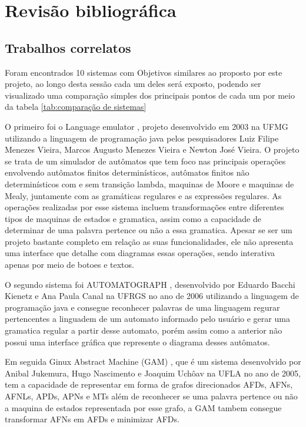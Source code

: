 \chapter{Revisão bibliográfica}
\label{cap:revisao}
\section{Trabalhos correlatos}
Foram encontrados 10 sistemas com Objetivos similares ao proposto por este projeto, ao longo desta sessão cada um deles será exposto, podendo ser visualizado uma comparação simples dos principais pontos de cada um por meio da tabela \ref{tab:comparação de sistemas}

O primeiro foi o Language emulator \cite{LanguageEmulator}, projeto desenvolvido em 2003 na UFMG  utilizando a linguagem de programação java pelos pesquisadores Luiz Filipe Menezes Vieira, Marcos Augusto Menezes Vieira e Newton José Vieira. O projeto se trata de um simulador de autômatos que tem foco nas principais operações envolvendo autômatos finitos determinísticos, autômatos finitos não determinísticos com e sem transição lambda, maquinas de Moore e maquinas de Mealy, juntamente com as gramáticas regulares e as expressões regulares. As operações realizadas por esse sistema incluem transformações entre diferentes tipos de maquinas de estados e gramatica, assim como a capacidade de determinar de uma palavra pertence ou não a essa gramatica. Apesar se ser um projeto bastante completo em relação as suas funcionalidades, ele não apresenta uma interface que detalhe com diagramas essas operações, sendo interativa apenas por meio de botoes e textos.

O segundo sistema foi AUTOMATOGRAPH  \cite{AUTOMATOGRAPH}, desenvolvido por Eduardo Bacchi Kienetz e Ana Paula Canal na UFRGS no ano de 2006 utilizando a linguagem de programação java e consegue reconhecer palavras de uma linguagem regurar pertencentes a linguadem de um automato informado pelo usuário e gerar uma gramatica regular a partir desse automato, porém assim como a anterior não possui uma interface gráfica que represente o diagrama desses autômatos.

Em seguida Ginux Abstract Machine (GAM) \cite{GAM}, que é um sistema desenvolvido por Anibal Jukemura, Hugo Nascimento e Joaquim Uchôav na UFLA no ano de 2005, tem a capacidade de representar em forma de grafos direcionados AFDs, AFNs, AFNLs, APDs, APNs e MTs além de reconhecer se uma palavra pertence ou não a maquina de estados representada por esse grafo, a GAM tambem consegue transformar AFNs em AFDs e minimizar AFDs.

